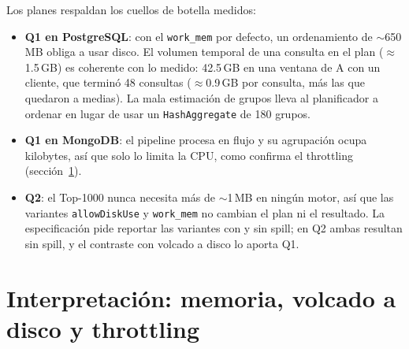 \documentclass[11pt,letterpaper]{article}
\begin{document}
\noindent Los planes respaldan los cuellos de botella medidos:
\begin{itemize}
  \item \textbf{Q1 en PostgreSQL}: con el \texttt{work\_mem} por defecto, un ordenamiento de
        $\sim$650\,MB obliga a usar disco. El volumen temporal de una consulta en el plan
        ($\approx$1.5\,GB) es coherente con lo medido: 42.5\,GB en una ventana de A con un cliente, que
        terminó 48 consultas ($\approx$0.9\,GB por consulta, más las que quedaron a medias). La
        mala estimación de grupos lleva al planificador a ordenar en lugar de usar un
        \texttt{HashAggregate} de 180 grupos.
  \item \textbf{Q1 en MongoDB}: el pipeline procesa en flujo y su agrupación ocupa kilobytes, así
        que solo lo limita la CPU, como confirma el throttling (sección~\ref{sec:interpretacion}).
  \item \textbf{Q2}: el Top-1000 nunca necesita más de $\sim$1\,MB en ningún motor, así que las
        variantes \texttt{allowDiskUse} y \texttt{work\_mem} no cambian el plan ni el resultado.
        La especificación pide reportar las variantes con y sin spill; en Q2 ambas resultan sin spill,
        y el contraste con volcado a disco lo aporta Q1.
\end{itemize}

\section{Interpretación: memoria, volcado a disco y throttling}
\label{sec:interpretacion}
\end{document}

